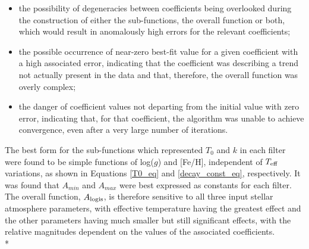 \documentclass[12pt, a4paper]{report}
\begin{document}
\begin{itemize}
\item the possibility of degeneracies between coefficients being overlooked during the construction of either the sub-functions, the overall function or both, which would result in anomalously high errors for the relevant coefficients;
\item the possible occurrence of near-zero best-fit value for a given coefficient with a high associated error, indicating that the coefficient was describing a trend not actually present in the data and that, therefore, the overall function was overly complex;
\item the danger of coefficient values not departing from the initial value with zero error, indicating that, for that coefficient, the algorithm was unable to achieve convergence, even after a very large number of iterations.
\end{itemize}

The best form for the sub-functions which represented $T_{0}$ and $k$ in each filter were found to be simple functions of log($g$) and [Fe/H], independent of $T_{\textnormal{eff}}$ variations, as shown in Equations \ref{T0_eq} and \ref{decay_const_eq}, respectively. It was found that $A_{min}$ and $A_{max}$ were best expressed as constants for each filter. The overall function, $A_{\textnormal{logis}}$, is therefore sensitive to all three input stellar atmosphere parameters, with effective temperature having the greatest effect and the other parameters having much smaller but still significant effects, with the relative magnitudes dependent on the values of the associated coefficients.\\*
\end{document}
